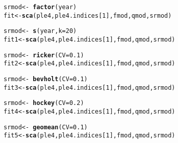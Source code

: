 \documentclass[a4paper,english,10pt]{article}\usepackage[]{graphicx}\usepackage[]{color}
\makeatletter
\newcommand{\hlnum}[1]{\textcolor[rgb]{0.686,0.059,0.569}{#1}}%
\newcommand{\hlopt}[1]{\textcolor[rgb]{0,0,0}{#1}}%
\newcommand{\hlstd}[1]{\textcolor[rgb]{0.345,0.345,0.345}{#1}}%
\newcommand{\hlkwb}[1]{\textcolor[rgb]{0.69,0.353,0.396}{#1}}%
\newcommand{\hlkwc}[1]{\textcolor[rgb]{0.333,0.667,0.333}{#1}}%
\newcommand{\hlkwd}[1]{\textcolor[rgb]{0.737,0.353,0.396}{\textbf{#1}}}%
\newenvironment{kframe}{%
 \def\at@end@of@kframe{}%
 \ifinner\ifhmode%
  \def\at@end@of@kframe{\end{minipage}}%
  \begin{minipage}{\columnwidth}%
 \fi\fi%
 \def\FrameCommand##1{\hskip\@totalleftmargin \hskip-\fboxsep
 \colorbox{shadecolor}{##1}\hskip-\fboxsep
     \hskip-\linewidth \hskip-\@totalleftmargin \hskip\columnwidth}%
 \MakeFramed {\advance\hsize-\width
   \@totalleftmargin\z@ \linewidth\hsize
   \@setminipage}}%
 {\par\unskip\endMakeFramed%
 \at@end@of@kframe}
\newenvironment{knitrout}{}{} %
\makeatother
\begin{document}
\begin{knitrout}
\color{fgcolor}\begin{kframe}
\begin{alltt}
\hlstd{srmod} \hlkwb{<-} \hlopt{~} \hlkwd{factor}\hlstd{(year)}
\hlstd{fit} \hlkwb{<-} \hlkwd{sca}\hlstd{(ple4, ple4.indices[}\hlnum{1}\hlstd{], fmod, qmod, srmod)}
\end{alltt}


{\ttfamily\noindent\bfseries{}}\begin{alltt}
\hlstd{srmod} \hlkwb{<-} \hlopt{~} \hlkwd{s}\hlstd{(year,} \hlkwc{k}\hlstd{=}\hlnum{20}\hlstd{)}
\hlstd{fit1} \hlkwb{<-} \hlkwd{sca}\hlstd{(ple4, ple4.indices[}\hlnum{1}\hlstd{], fmod, qmod, srmod)}
\end{alltt}


{\ttfamily\noindent\bfseries{}}\begin{alltt}
\hlstd{srmod} \hlkwb{<-} \hlopt{~} \hlkwd{ricker}\hlstd{(}\hlkwc{CV}\hlstd{=}\hlnum{0.1}\hlstd{)}
\hlstd{fit2} \hlkwb{<-} \hlkwd{sca}\hlstd{(ple4, ple4.indices[}\hlnum{1}\hlstd{], fmod, qmod, srmod)}
\end{alltt}


{\ttfamily\noindent\bfseries{}}\begin{alltt}
\hlstd{srmod} \hlkwb{<-} \hlopt{~} \hlkwd{bevholt}\hlstd{(}\hlkwc{CV}\hlstd{=}\hlnum{0.1}\hlstd{)}
\hlstd{fit3} \hlkwb{<-} \hlkwd{sca}\hlstd{(ple4, ple4.indices[}\hlnum{1}\hlstd{], fmod, qmod, srmod)}
\end{alltt}


{\ttfamily\noindent\bfseries{}}\begin{alltt}
\hlstd{srmod} \hlkwb{<-} \hlopt{~} \hlkwd{hockey}\hlstd{(}\hlkwc{CV}\hlstd{=}\hlnum{0.2}\hlstd{)}
\hlstd{fit4} \hlkwb{<-} \hlkwd{sca}\hlstd{(ple4, ple4.indices[}\hlnum{1}\hlstd{], fmod, qmod, srmod)}
\end{alltt}


{\ttfamily\noindent\bfseries{}}\begin{alltt}
\hlstd{srmod} \hlkwb{<-} \hlopt{~} \hlkwd{geomean}\hlstd{(}\hlkwc{CV}\hlstd{=}\hlnum{0.1}\hlstd{)}
\hlstd{fit5} \hlkwb{<-} \hlkwd{sca}\hlstd{(ple4, ple4.indices[}\hlnum{1}\hlstd{], fmod, qmod, srmod)}
\end{alltt}



\end{kframe}
\end{knitrout}
\end{document}
